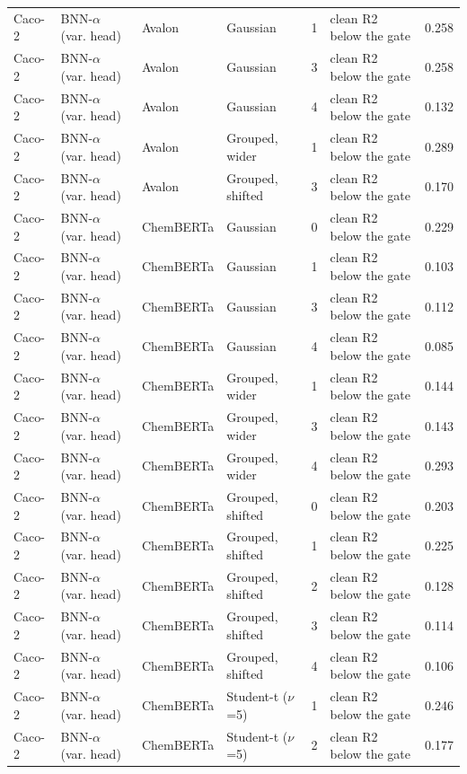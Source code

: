 {\begin{longtable}{llllcll}
Caco-2 & BNN-$\alpha$ (var. head) & Avalon & Gaussian & 1 & clean R2 below the gate & 0.258 \\
Caco-2 & BNN-$\alpha$ (var. head) & Avalon & Gaussian & 3 & clean R2 below the gate & 0.258 \\
Caco-2 & BNN-$\alpha$ (var. head) & Avalon & Gaussian & 4 & clean R2 below the gate & 0.132 \\
Caco-2 & BNN-$\alpha$ (var. head) & Avalon & Grouped, wider & 1 & clean R2 below the gate & 0.289 \\
Caco-2 & BNN-$\alpha$ (var. head) & Avalon & Grouped, shifted & 3 & clean R2 below the gate & 0.170 \\
Caco-2 & BNN-$\alpha$ (var. head) & ChemBERTa & Gaussian & 0 & clean R2 below the gate & 0.229 \\
Caco-2 & BNN-$\alpha$ (var. head) & ChemBERTa & Gaussian & 1 & clean R2 below the gate & 0.103 \\
Caco-2 & BNN-$\alpha$ (var. head) & ChemBERTa & Gaussian & 3 & clean R2 below the gate & 0.112 \\
Caco-2 & BNN-$\alpha$ (var. head) & ChemBERTa & Gaussian & 4 & clean R2 below the gate & 0.085 \\
Caco-2 & BNN-$\alpha$ (var. head) & ChemBERTa & Grouped, wider & 1 & clean R2 below the gate & 0.144 \\
Caco-2 & BNN-$\alpha$ (var. head) & ChemBERTa & Grouped, wider & 3 & clean R2 below the gate & 0.143 \\
Caco-2 & BNN-$\alpha$ (var. head) & ChemBERTa & Grouped, wider & 4 & clean R2 below the gate & 0.293 \\
Caco-2 & BNN-$\alpha$ (var. head) & ChemBERTa & Grouped, shifted & 0 & clean R2 below the gate & 0.203 \\
Caco-2 & BNN-$\alpha$ (var. head) & ChemBERTa & Grouped, shifted & 1 & clean R2 below the gate & 0.225 \\
Caco-2 & BNN-$\alpha$ (var. head) & ChemBERTa & Grouped, shifted & 2 & clean R2 below the gate & 0.128 \\
Caco-2 & BNN-$\alpha$ (var. head) & ChemBERTa & Grouped, shifted & 3 & clean R2 below the gate & 0.114 \\
Caco-2 & BNN-$\alpha$ (var. head) & ChemBERTa & Grouped, shifted & 4 & clean R2 below the gate & 0.106 \\
Caco-2 & BNN-$\alpha$ (var. head) & ChemBERTa & Student-t ($\nu$=5) & 1 & clean R2 below the gate & 0.246 \\
Caco-2 & BNN-$\alpha$ (var. head) & ChemBERTa & Student-t ($\nu$=5) & 2 & clean R2 below the gate & 0.177 \\

\end{longtable}}
